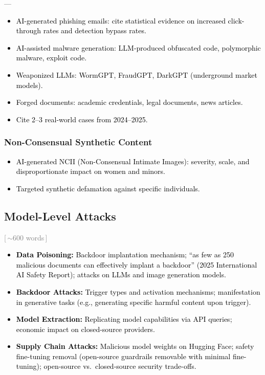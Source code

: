 ––\documentclass[preprint,12pt]{elsarticle}
\newcommand{\wordcount}[1]{\hfill\textcolor{gray}{\small[\,#1\,]}}
\newcommand{\outline}[1]{\textcolor{black}{#1}}
\begin{document}
\outline{%
\begin{itemize}[nosep,leftmargin=1.5em]
    \item AI-generated phishing emails: cite statistical evidence on increased click-through rates and detection bypass rates.
    \item AI-assisted malware generation: LLM-produced obfuscated code, polymorphic malware, exploit code.
    \item Weaponized LLMs: WormGPT, FraudGPT, DarkGPT (underground market models).
    \item Forged documents: academic credentials, legal documents, news articles.
    \item Cite 2--3 real-world cases from 2024--2025.
\end{itemize}
}

\subsubsection{Non-Consensual Synthetic Content}

\outline{%
\begin{itemize}[nosep,leftmargin=1.5em]
    \item AI-generated NCII (Non-Consensual Intimate Images): severity, scale, and disproportionate impact on women and minors.
    \item Targeted synthetic defamation against specific individuals.
\end{itemize}
}


\subsection{Model-Level Attacks} \wordcount{$\sim$600 words}
\label{sec:threat-model}

\outline{%
\begin{itemize}[nosep,leftmargin=1.5em]
    \item \textbf{Data Poisoning:} Backdoor implantation mechanism; ``as few as 250 malicious documents can effectively implant a backdoor'' (2025 International AI Safety Report); attacks on LLMs and image generation models.
    \item \textbf{Backdoor Attacks:} Trigger types and activation mechanisms; manifestation in generative tasks (e.g., generating specific harmful content upon trigger).
    \item \textbf{Model Extraction:} Replicating model capabilities via API queries; economic impact on closed-source providers.
    \item \textbf{Supply Chain Attacks:} Malicious model weights on Hugging Face; safety fine-tuning removal (open-source guardrails removable with minimal fine-tuning); open-source vs.\ closed-source security trade-offs.
\end{itemize}
}
\end{document}
